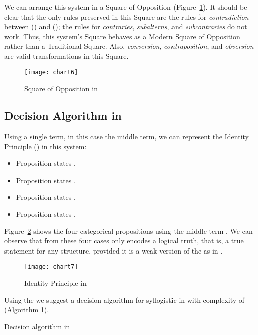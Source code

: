 \documentclass[a4paper,UKenglish]{lipics}
\begin{document}
We can arrange this system in a Square of Opposition (Figure~\ref{fig:5}). It should be clear that the only rules preserved in this Square are the rules for \textit{contradiction} between  () and  (); the rules for \textit{contraries}, \textit{subalterns}, and \textit{subcontraries} do not work. Thus, this system's Square behaves as a Modern Square of Opposition rather than a Traditional Square. Also, \textit{conversion}, \textit{contraposition}, and \textit{obversion} are valid transformations in this Square.  

\begin{figure}[h]
  \texttt{[image: chart6]}
  \caption{Square of Opposition in }
  \label{fig:5}
\end{figure}

\subsection{Decision Algorithm in }
Using a single term, in this case the middle term, we can represent the Identity Principle () in this system: 

\begin{itemize}
\item Proposition  states .
\item Proposition  states .
\item Proposition  states .
\item Proposition  states .
\end{itemize}

Figure~\ref{fig:9} shows the four categorical propositions using the middle term . We can observe that from these four cases only  encodes a logical truth, that is, a true statement for any structure, provided it is a weak version of the  as in . 

\pagebreak

\begin{figure}[h]
  \texttt{[image: chart7]}
  \caption{Identity Principle in }
  \label{fig:9}
\end{figure}

Using the  we suggest a decision algorithm for syllogistic in  with complexity of  (Algorithm 1).

\begin{algorithm}
  \SetAlgoLined\scriptsize
  \caption{Decision algorithm in }
  \label{alg:1}
\end{algorithm}
\end{document}
